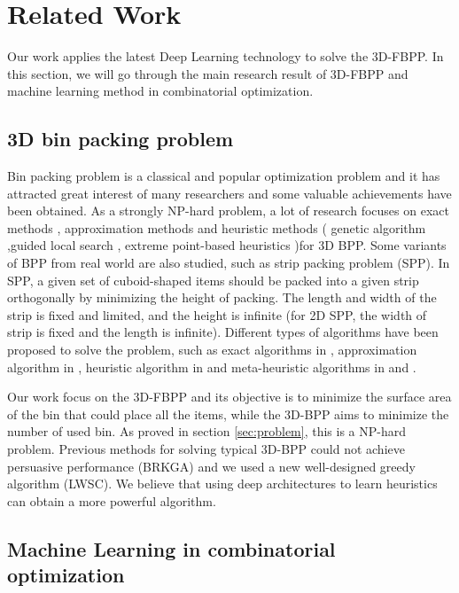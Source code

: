 \section{Related Work}
\label{sec:related}

Our work applies the latest Deep Learning technology to solve the 3D-FBPP. In this section, we will go through the main research result of 3D-FBPP and machine learning method in combinatorial optimization.

\subsection{3D bin packing problem}

Bin packing problem is a classical and popular optimization problem and it has attracted great interest of many researchers and some valuable achievements have been obtained. As a strongly NP-hard problem, a lot of research focuses on exact methods \cite{chen1995analytical}, approximation methods \cite{scheithauer1991three} and heuristic methods ( genetic algorithm \cite{gonccalves2013biased},guided local search \cite{faroe2003guided}, extreme point-based heuristics \cite{crainic2008extreme})for 3D BPP. Some variants of BPP from real world are also studied, such as strip packing problem (SPP). In SPP, a given set of cuboid-shaped items should be packed into a given strip orthogonally by minimizing the height of packing. The length and width of the strip is fixed and limited, and the height is infinite (for 2D SPP, the width of strip is fixed and the length is infinite). Different types of algorithms have been proposed to solve the problem, such as exact algorithms in \cite{kenmochi2009exact}, approximation algorithm in \cite{steinberg1997strip}, heuristic algorithm in \cite{bortfeldt2007heuristic} and meta-heuristic algorithms in \cite{bortfeldt2006genetic} and \cite{hopper2001review}.

Our work focus on the 3D-FBPP and its objective is to minimize the surface area of the bin that could place all the items, while the 3D-BPP aims to minimize the number of used bin. As proved in section \ref{sec:problem}, this is a NP-hard problem. Previous methods for solving typical 3D-BPP could not achieve persuasive performance (BRKGA) and we used a new well-designed greedy algorithm (LWSC). We believe that using deep architectures to learn heuristics can obtain a more powerful algorithm.

\subsection{Machine Learning in combinatorial optimization}

